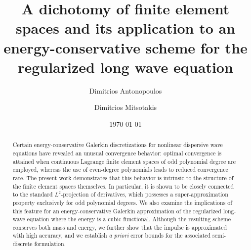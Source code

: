 \documentclass{amsart}
\begin{document}
\title[A dichotomy of finite element spaces and its application to an energy-conservative scheme for the regularized long wave equation]{A dichotomy of finite element spaces and its application to an energy-conservative scheme for the regularized long wave equation}


\author{Dimitrios Antonopoulos}
\address{\textbf{D.~Antonopoulos:} Department of Mathematics, University of Athens, 15784 Zographou, Greece}

\author{Dimitrios Mitsotakis}
\address{\textbf{D.~Mitsotakis:} Victoria University of Wellington, School of Mathematics and Statistics, PO Box 600, Wellington 6140, New Zealand}





\date{\today}




\begin{abstract}
Certain energy-conservative Galerkin discretizations for nonlinear dispersive wave equations have revealed an unusual convergence behavior: optimal convergence is attained when continuous Lagrange finite element spaces of odd polynomial degree are employed, whereas the use of even-degree polynomials leads to reduced convergence rate. The present work demonstrates that this behavior is intrinsic to the structure of the finite element spaces themselves. In particular, it is shown to be closely connected to the standard $L^2$-projection of derivatives, which possesses a super-approximation property exclusively for odd polynomial degrees. We also examine the implications of this feature for an energy-conservative Galerkin approximation of the regularized long-wave equation where the energy is a cubic functional. Although the resulting scheme conserves both mass and energy, we further show that the impulse is approximated with high accuracy, and we establish {\em a priori} error bounds for the associated semi-discrete formulation.
\end{abstract}
\end{document}
